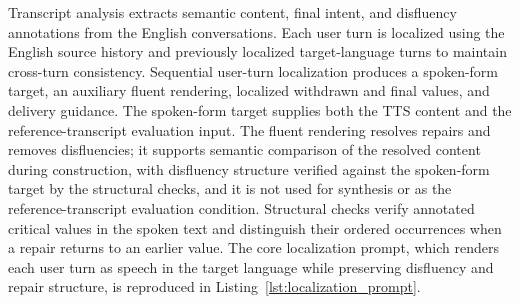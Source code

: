 \documentclass{article}
\begin{document}
Transcript analysis extracts semantic content, final intent, and disfluency annotations from the English conversations. Each user turn is localized using the English source history and previously localized target-language turns to maintain cross-turn consistency. Sequential user-turn localization produces a spoken-form target, an auxiliary fluent rendering, localized withdrawn and final values, and delivery guidance. The spoken-form target supplies both the TTS content and the reference-transcript evaluation input. The fluent rendering resolves repairs and removes disfluencies; it supports semantic comparison of the resolved content during construction, with disfluency structure verified against the spoken-form target by the structural checks, and it is not used for synthesis or as the reference-transcript evaluation condition. Structural checks verify annotated critical values in the spoken text and distinguish their ordered occurrences when a repair returns to an earlier value. The core localization prompt, which renders each user turn as speech in the target language while preserving disfluency and repair structure, is reproduced in Listing~\ref{lst:localization_prompt}.
\end{document}
